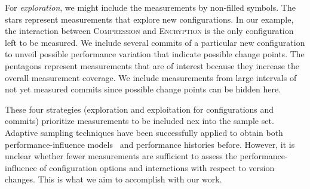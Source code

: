 \documentclass[sigconf]{acmart}
\begin{document}
	 For \emph{exploration}, we might include the measurements by non-filled symbols. The stars represent measurements that explore new configurations. In our example, the interaction between \textsc{Compression} and \textsc{Encryption} is the only configuration left to be measured. We include several commits of a particular new configuration to unveil possible performance variation that indicate possible change points. The pentagons represent measurements that are of interest because they increase the overall measurement coverage. We include measurements from large intervals of not yet measured commits since possible change points can be hidden here.
	 
	These four strategies (exploration and exploitation for configurations and commits) prioritize measurements to be included nex into the sample set. Adaptive sampling techniques have been successfully applied to obtain both performance-influence models~\cite{siegmundPredictingPerformanceAutomated2012,sarkarCostEfficientSamplingPerformance} and performance histories\cite{muhlbauer_accurate_2019} before. However, it is unclear whether fewer measurements are sufficient to assess the performance-influence of configuration options and interactions with respect to version changes. This is what we aim to accomplish with our work.
	
	

	
\end{document}
